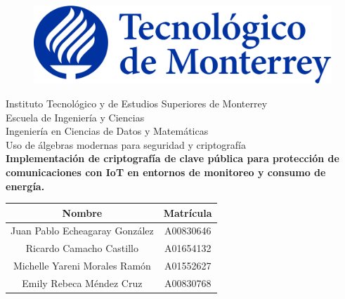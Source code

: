 \documentclass{article}
\begin{document}
    \begin{titlepage}
        \begin{center}
            \begin{figure}
                \centering
                \includegraphics[scale=0.13]{logo_itesm.png}\\ %
            \end{figure}
            \vspace{5cm}
            \LARGE{Instituto Tecnológico y de Estudios Superiores de Monterrey}\\
            \vspace{1cm}
            \large Escuela de Ingeniería y Ciencias \\
            \vspace{0.2cm}
            \large Ingeniería en Ciencias de Datos y Matemáticas \\
            \vspace{0.2cm}
            \large Uso de álgebras modernas para seguridad y criptografía \\
            \vspace{1cm}
            \textbf{Implementación de criptografía de clave pública para protección de comunicaciones con IoT en entornos de monitoreo y consumo de energía.}\\
            \vspace{0.7cm}
            \begin{table}[h!]
                \centering
                \begin{tabular}{ ||c|c|| }
                    \hline
                    Nombre & Matrícula \\
                    \hline
                    Juan Pablo Echeagaray González & A00830646 \\
                    \hline
                    Ricardo Camacho Castillo & A01654132 \\
                    \hline
                    Michelle Yareni Morales Ramón & A01552627 \\
                    \hline
                    Emily Rebeca Méndez Cruz & A00830768 \\

\end{tabular}
\end{table}
\end{center}
\end{titlepage}
\end{document}
